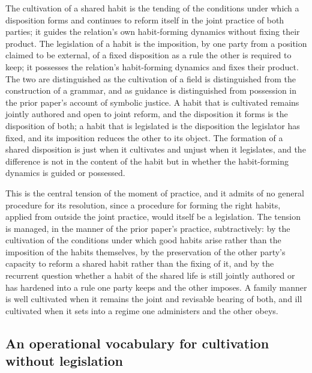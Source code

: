 \begin{claim}
The cultivation of a shared habit is the tending of the conditions under which a disposition forms and continues to reform itself in the joint practice of both parties; it guides the relation's own habit-forming dynamics without fixing their product. The legislation of a habit is the imposition, by one party from a position claimed to be external, of a fixed disposition as a rule the other is required to keep; it possesses the relation's habit-forming dynamics and fixes their product. The two are distinguished as the cultivation of a field is distinguished from the construction of a grammar, and as guidance is distinguished from possession in the prior paper's account of symbolic justice. A habit that is cultivated remains jointly authored and open to joint reform, and the disposition it forms is the disposition of both; a habit that is legislated is the disposition the legislator has fixed, and its imposition reduces the other to its object. The formation of a shared disposition is just when it cultivates and unjust when it legislates, and the difference is not in the content of the habit but in whether the habit-forming dynamics is guided or possessed.
\end{claim}

\noindent
This is the central tension of the moment of practice, and it admits of no general procedure for its resolution, since a procedure for forming the right habits, applied from outside the joint practice, would itself be a legislation. The tension is managed, in the manner of the prior paper's practice, subtractively: by the cultivation of the conditions under which good habits arise rather than the imposition of the habits themselves, by the preservation of the other party's capacity to reform a shared habit rather than the fixing of it, and by the recurrent question whether a habit of the shared life is still jointly authored or has hardened into a rule one party keeps and the other imposes. A family manner is well cultivated when it remains the joint and revisable bearing of both, and ill cultivated when it sets into a regime one administers and the other obeys.

\subsection{An operational vocabulary for cultivation without legislation}
\label{p11:sec:prac-vocabulary}


